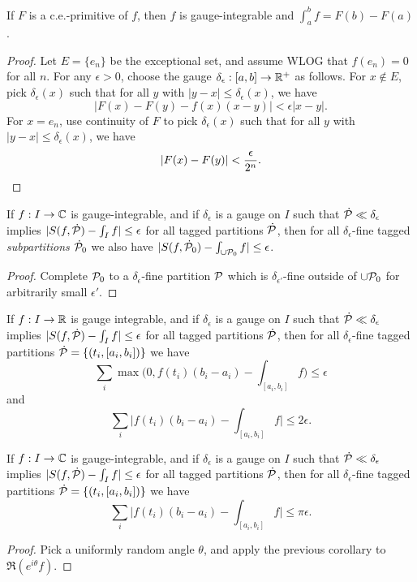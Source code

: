 \begin{thm} If $F$ is a c.e.-primitive of $f$, then $f$ is gauge-integrable and $\int_a^b f = F(b) - F(a)$.
\end{thm}
\begin{proof} Let $E = \{e_n\}$ be the exceptional set, and assume WLOG that $f(e_n) = 0$ for all $n$. For any $\epsilon > 0$, choose the gauge $\delta_\epsilon : [a,b] \rightarrow \mathbb{R}^+$ as follows. For $x \not\in E$, pick $\delta_\epsilon(x)$ such that for all $y$ with $|y-x| \le \delta_\epsilon(x)$, we have
\[
|F(x) - F(y) - f(x)(x-y)| < \epsilon|x-y|.
\]
For $x = e_n$, use continuity of $F$ to pick $\delta_\epsilon(x)$ such that for all $y$ with $|y-x| \le \delta_\epsilon(x)$, we have
\[
|F(x) - F(y)| < \frac{\epsilon}{2^n}.\qedhere
\]
\end{proof}

\begin{lem}\label{saks-henstock} If $f : I \rightarrow \mathbb{C}$ is gauge-integrable, and if $\delta_\epsilon$ is a gauge on $I$ such that $\dot{\mathcal{P}} \ll \delta_\epsilon$ implies $|S(f,\dot{\mathcal{P}}) - \int_I f| \le \epsilon$ for all tagged partitions $\dot{\mathcal{P}}$, then for all $\delta_\epsilon$-fine tagged \emph{subpartitions} $\dot{\mathcal{P}}_0$ we also have $|S(f,\dot{\mathcal{P}}_0) - \int_{\cup \mathcal{P}_0} f| \le \epsilon$.
\end{lem}
\begin{proof} Complete $\mathcal{P}_0$ to a $\delta_\epsilon$-fine partition $\mathcal{P}$ which is $\delta_{\epsilon'}$-fine outside of $\cup \mathcal{P}_0$ for arbitrarily small $\epsilon'$.
\end{proof}

\begin{cor} If $f : I \rightarrow \mathbb{R}$ is gauge integrable, and if $\delta_\epsilon$ is a gauge on $I$ such that $\dot{\mathcal{P}} \ll \delta_\epsilon$ implies $|S(f,\dot{\mathcal{P}}) - \int_I f| \le \epsilon$ for all tagged partitions $\dot{\mathcal{P}}$, then for all $\delta_\epsilon$-fine tagged partitions $\dot{\mathcal{P}} = \{(t_i,[a_i,b_i])\}$ we have
\[
\sum_i \max\Big(0, f(t_i)(b_i-a_i) - \int_{[a_i,b_i]} f\Big) \le \epsilon
\]
and
\[
\sum_i \Big|f(t_i)(b_i-a_i) - \int_{[a_i,b_i]} f\Big| \le 2\epsilon.
\]
\end{cor}

\begin{cor} If $f : I \rightarrow \mathbb{C}$ is gauge-integrable, and if $\delta_\epsilon$ is a gauge on $I$ such that $\dot{\mathcal{P}} \ll \delta_\epsilon$ implies $|S(f,\dot{\mathcal{P}}) - \int_I f| \le \epsilon$ for all tagged partitions $\dot{\mathcal{P}}$, then for all $\delta_\epsilon$-fine tagged partitions $\dot{\mathcal{P}} = \{(t_i,[a_i,b_i])\}$ we have
\[
\sum_i \Big|f(t_i)(b_i-a_i) - \int_{[a_i,b_i]} f\Big| \le \pi\epsilon.
\]
\end{cor}
\begin{proof} Pick a uniformly random angle $\theta$, and apply the previous corollary to $\Re(e^{i\theta}f)$.
\end{proof}

